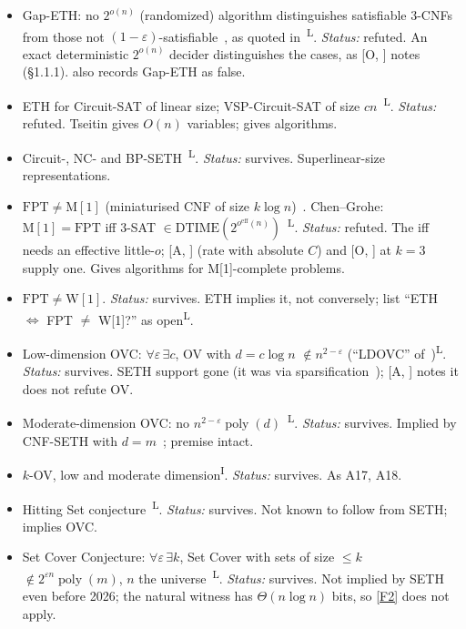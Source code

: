 \documentclass[10pt]{amsart}
\theoremstyle{plain}
\theoremstyle{definition}
\theoremstyle{remark}
\numberwithin{equation}{section}
\newcommand{\poly}{\operatorname{poly}}
\newcommand{\A}[1][]{\textup{[A\if\relax\detokenize{#1}\relax\else, #1\fi]}}
\newcommand{\Oa}[1][]{\textup{[O\if\relax\detokenize{#1}\relax\else, #1\fi]}}
\newcommand{\Lit}{\textsuperscript{L}}
\newcommand{\Inf}{\textsuperscript{I}}
\begin{document}
{\begin{itemize}[leftmargin=2.6em,itemsep=2pt]
\item[A12] Gap-ETH: no $2^{o(n)}$ (randomized) algorithm distinguishes satisfiable $3$-CNFs from those not $(1-\varepsilon)$-satisfiable~\cite{Dinur16,MR16}, as quoted in~\cite{CCKLMNT17}\Lit. \emph{Status:} refuted. An exact deterministic $2^{o(n)}$ decider distinguishes the cases, as \Oa{} notes (\S1.1.1). \cite{Man26} also records Gap-ETH as false.
\item[A13] ETH for Circuit-SAT of linear size; VSP-Circuit-SAT of size $cn$~\cite[Thm.~1.1(v)]{CDLMNOPSW16}\Lit. \emph{Status:} refuted. Tseitin gives $O(n)$ variables; gives algorithms.
\item[A14] Circuit-, NC- and BP-SETH~\cite{AHVWW16}\Lit. \emph{Status:} survives. Superlinear-size representations.
\item[A15] $\mathrm{FPT}\ne\mathrm{M}[1]$ (miniaturised CNF of size $k\log n$)~\cite[\S3.5]{DT11}. Chen--Grohe: $\mathrm{M}[1]=\mathrm{FPT}$ iff $3$-SAT $\in\mathrm{DTIME}(2^{o^{\mathrm{eff}}(n)})$~\cite{CG07}\Lit. \emph{Status:} refuted. The iff needs an effective little-$o$; \A{} (rate with absolute $C$) and \Oa{} at $k=3$ supply one. Gives algorithms for M[1]-complete problems.
\item[A16] $\mathrm{FPT}\ne\mathrm{W}[1]$. \emph{Status:} survives. ETH implies it, not conversely; \cite[\S6]{CG07} list ``ETH $\Leftrightarrow$ FPT $\ne$ W[1]?'' as open\Lit.
\item[A17] Low-dimension OVC: $\forall\varepsilon\,\exists c$, OV with $d=c\log n$ $\notin n^{2-\varepsilon}$ (``LDOVC'' of~\cite{GIKW17})\Lit. \emph{Status:} survives. SETH support gone (it was via sparsification~\cite[Lemma~2.1]{BK15}); \A{} notes it does not refute OV.
\item[A18] Moderate-dimension OVC: no $n^{2-\varepsilon}\poly(d)$~\cite{GIKW17}\Lit. \emph{Status:} survives. Implied by CNF-SETH with $d=m$~\cite[Lemma~1]{ABV15}; premise intact.
\item[A19] $k$-OV, low and moderate dimension\Inf. \emph{Status:} survives. As A17, A18.
\item[A20] Hitting Set conjecture~\cite{AVWW16}\Lit. \emph{Status:} survives. Not known to follow from SETH; implies OVC.
\item[A21] Set Cover Conjecture: $\forall\varepsilon\,\exists k$, Set Cover with sets of size $\le k$ $\notin2^{\varepsilon n}\poly(m)$, $n$ the universe~\cite[Thm.~1.2]{CDLMNOPSW16}\Lit. \emph{Status:} survives. Not implied by SETH even before 2026; the natural witness has $\Theta(n\log n)$ bits, so \ref{F2} does not apply.

\end{itemize}}
\end{document}
